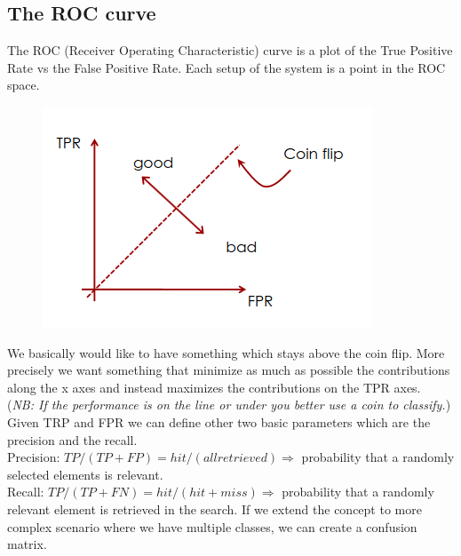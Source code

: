\subsection{The ROC curve}
The ROC (Receiver Operating Characteristic) curve is a plot of the True Positive Rate vs the False Positive Rate. Each setup of the system is a point in the ROC space.
\begin{figure}[h]
    \centering
    \includegraphics[scale=0.5]{Figures/ROC.png}
\end{figure}
We basically would like to have something which stays above the coin flip. More precisely we want something that minimize as much as possible the contributions along the x axes and instead maximizes the contributions on the TPR axes.
\\(\textit{NB: If the performance is on the line or under you better use a coin to classify.})
Given TRP and FPR we can define other two basic parameters which are the precision and the recall.
\\Precision: $TP/(TP+FP) = hit/(all retrieved) \Rightarrow$ probability that a randomly selected elements is relevant.
\\Recall: $TP/(TP+FN) = hit/(hit+miss) \Rightarrow$ probability that a randomly relevant element is retrieved in the search.
If we extend the concept to more complex scenario where we have multiple classes, we can create a confusion matrix. 
